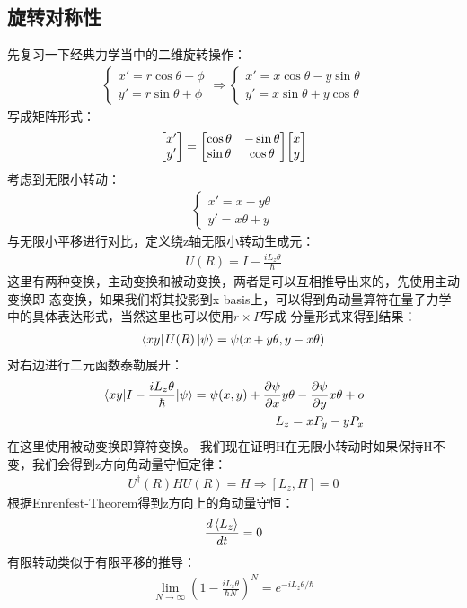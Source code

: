 \documentclass[UTF8]{article}
\numberwithin{equation}{section}
\begin{document}
\subsection{旋转对称性}
先复习一下经典力学当中的二维旋转操作：
\begin{align*}
    \begin{cases}
        x'=r\cos{\theta+\phi} \\
        y'=r\sin{\theta+\phi}
    \end{cases}
    \Rightarrow
    \begin{cases}
        x'=x\cos{\theta}-y\sin{\theta} \\
        y'=x\sin{\theta}+y\cos{\theta}
    \end{cases}
\end{align*}
写成矩阵形式：
\begin{align*}
    \mqty[x' \\y']=\mqty[\cos{\theta}&-\sin{\theta}\\ \sin{\theta}&\cos\theta]\mqty[x\\y]
\end{align*}
考虑到无限小转动：
\begin{align*}
    \begin{cases}
        x'=x-y\theta \\
        y'=x\theta+y
    \end{cases}
\end{align*}
与无限小平移进行对比，定义绕z轴无限小转动生成元：
\begin{align*}
    U(R)=I-\frac{iL_z\theta}{\hbar}
\end{align*}
这里有两种变换，主动变换和被动变换，两者是可以互相推导出来的，先使用主动变换即
态变换，如果我们将其投影到x basis上，可以得到角动量算符在量子力学中的具体表达形式，当然这里也可以使用$r\times P$写成
分量形式来得到结果：
\begin{align*}
    \bra{xy}U(R)\ket{\psi}=\psi(x+y\theta,y-x\theta)
\end{align*}
对右边进行二元函数泰勒展开：
\begin{align*}
    \matrixel{xy}{I-\frac{iL_z \theta}{\hbar}}{\psi}=\psi(x,y)+\pdv{\psi}{x} y\theta-\pdv{\psi}{y}x\theta+o \\
    L_z = xP_y-yP_x
\end{align*}
在这里使用被动变换即算符变换。
我们现在证明H在无限小转动时如果保持H不变，我们会得到z方向角动量守恒定律：
\begin{align*}
    U^\dagger(R)HU(R)=H\Rightarrow [L_z,H]=0
\end{align*}
根据Enrenfest-Theorem得到z方向上的角动量守恒：
\begin{align*}
    \frac{d\expval{L_z}}{dt}=0
\end{align*}
有限转动类似于有限平移的推导：
\begin{align*}
    \lim_{N\rightarrow\infty}(1-\frac{iL_z\theta}{\hbar N})^N=e^{-iL_z \theta/\hbar}
\end{align*}
\end{document}

